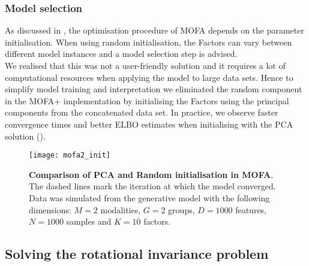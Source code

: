 \subsubsection{Model selection} \label{section:mofa2_model_selection}

As discussed in , the optimisation procedure of MOFA depends on the parameter initialisation. When using random initialisation, the Factors can vary between different model instances and a model selection step is advised.\\
We realised that this was not a user-friendly solution and it requires a lot of computational resources when applying the model to large data sets. Hence to simplify model training and interpretation we eliminated the random component in the MOFA+ implementation by initialising the Factors using the principal components from the concatenated data set. In practice, we observe faster convergence times and better ELBO estimates when initialising with the PCA solution ().

\begin{figure}[H]
	\centering
	\texttt{[image: mofa2\_init]}
	\caption[]{
	\textbf{Comparison of PCA and Random initialisation in MOFA}.\\ The dashed lines mark the iteration at which the model converged. Data was simulated from the generative model with the following dimensions: $M=2$ modalities, $G=2$ groups, $D=1000$ features, $N=1000$ samples and $K=10$ factors.
	}
	\label{fig:mofa2_init}
\end{figure}

\subsection{Solving the rotational invariance problem} \label{section:mofa2_rotational_invariance}

